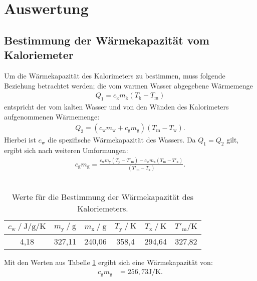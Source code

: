 \section{Auswertung}
\label{sec:Auswertung}
\subsection{Bestimmung der Wärmekapazität vom Kaloriemeter}
Um die Wärmekapazität des Kalorimeters zu bestimmen, muss folgende Beziehung betrachtet werden;
die vom warmen Wasser abgegebene Wärmemenge
\begin{align}
Q_\mathrm{1}=c_\mathrm{k} m_\mathrm{k}(T_\mathrm{k}-T_\mathrm{m})
\end{align}
entspricht der vom kalten Wasser und von den Wänden des Kalorimeters aufgenommenen Wärmemenge:
\begin{align}
Q_\mathrm{2}=(c_\mathrm{w} m_\mathrm{w} + c_\mathrm{g} m_\mathrm{g}) (T_\mathrm{m}-T_\mathrm{w}).
\end{align}
Hierbei ist $c_\mathrm{w}$ die spezifische Wärmekapazität des Wassers.
Da $Q_\mathrm {1}=Q_\mathrm{2}$ gilt, ergibt sich nach weiteren Umformungen:
\begin{align}
c_\mathrm{g} m_\mathrm{g}=\frac{c_\mathrm{w} m_\mathrm{y}(T_\mathrm{y}-T'_\mathrm{m})-c_\mathrm{w} m_\mathrm{x}(T_\mathrm{m}-T'_\mathrm{x})}{(T'_\mathrm{m}-T_\mathrm{x})}.
\end{align}\\
\begin{table}
   \centering
   \caption{Werte für die Bestimmung der Wärmekapazität des Kaloriemeters.}
   \label{tab:nullmessung}
    \begin{tabular}{c c c c c c}
     \toprule
      $c_\mathrm{w}\:/\ \si{\joule\per\gram\per\kelvin}$ & $m_\mathrm{y}\:/\ \si{\gram}$ & $m_\mathrm{x}\:/\ \si{\gram}$ & $T_\mathrm{y}\:/\ \si{\kelvin}$ &  $T_\mathrm{x}\:/\ \si{\kelvin}$ & $T'_\mathrm{m}/\si{\kelvin}$  \\
      \midrule
      4,18 & 327,11 & 240,06 & 358,4 & 294,64 & 327,82 \\
      \bottomrule
    \end{tabular}
\end{table}
Mit den Werten aus Tabelle \ref{tab:nullmessung} ergibt sich eine Wärmekapazität von:
\begin{align*}
  c_\mathrm{g}m_\mathrm{g}&=256,73 \si{\joule\per\kelvin}.
\end{align*}\\
